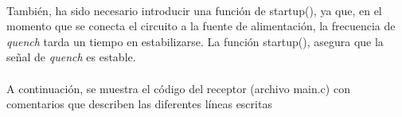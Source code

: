 \paragraph{}
También, ha sido necesario introducir una función de startup(), ya que, en el momento que se conecta el circuito a la fuente de alimentación, la frecuencia de \textit{quench} tarda un tiempo en estabilizarse. La función startup(), asegura que la señal de \textit{quench} es estable.


\paragraph{} A continuación, se muestra el código del receptor (archivo main.c) con comentarios que describen las diferentes líneas escritas


